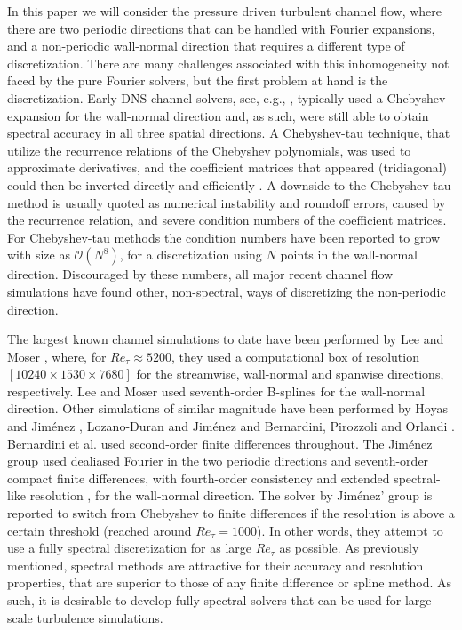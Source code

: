 \documentclass[preprint]{elsarticle}
\begin{document}
In this paper we will consider the pressure driven turbulent channel flow, where there are two periodic directions that can be handled with Fourier expansions, and a non-periodic wall-normal direction that requires a different type of discretization. There are many challenges associated with this inhomogeneity not faced by the pure Fourier solvers, but the first problem at hand is the discretization. Early DNS channel solvers, see, e.g., \cite{Moin80, Kleiser80, Kim87}, typically used a Chebyshev expansion for the wall-normal direction and, as such, were still able to obtain spectral accuracy in all three spatial directions. A Chebyshev-tau technique, that utilize the recurrence relations of the Chebyshev polynomials, was used to approximate derivatives, and the coefficient matrices that appeared (tridiagonal) could then be inverted directly and efficiently \cite{Kim87}. A downside to the Chebyshev-tau method is usually quoted \cite{canuto1988} as numerical instability and roundoff errors, caused by the recurrence relation, and severe condition numbers of the coefficient matrices. For Chebyshev-tau methods the condition numbers have been reported to grow with size as $\mathcal{O}(N^8)$, for a discretization using $N$ points in the wall-normal direction. Discouraged by these numbers, all major recent channel flow simulations have found other, non-spectral, ways of discretizing the non-periodic direction. 


The largest known channel simulations to date have been performed by Lee and Moser \cite{leemoser15}, where, for $Re_{\tau}\approx 5200$, they used a computational box of resolution $[10240 \times 1530 \times 7680]$ for the streamwise, wall-normal and spanwise directions, respectively. Lee and Moser used seventh-order B-splines for the wall-normal direction. Other simulations of similar magnitude have been performed by Hoyas and Jim\'{e}nez \cite{hoyas06, hoyas08}, Lozano-Duran and Jim\'{e}nez \cite{Lozano2014} and Bernardini, Pirozzoli and Orlandi \cite{bernardini2014}. Bernardini et al. used second-order finite differences throughout. The Jim\'{e}nez group used dealiased Fourier in the two periodic directions and seventh-order compact finite differences, with fourth-order consistency and extended spectral-like resolution \cite{Lele92}, for the wall-normal direction. The solver by Jim\'{e}nez' group is reported to switch from Chebyshev to finite differences if the resolution is above a certain threshold \cite{hoyas08} (reached around $Re_{\tau}=1000$). In other words, they attempt to use a fully spectral discretization for as large $Re_{\tau}$ as possible. As previously mentioned, spectral methods are attractive for their accuracy and resolution properties, that are superior to those of any finite difference or spline method. As such, it is desirable to develop fully spectral solvers that can be used for large-scale turbulence simulations.
\end{document}

